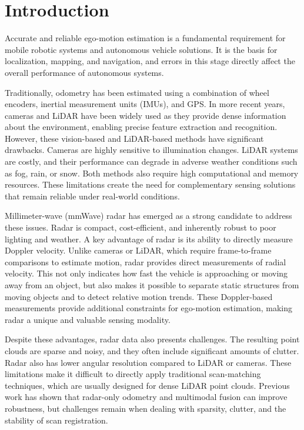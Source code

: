 \section{Introduction}
\label{sec:introduction}

Accurate and reliable ego-motion estimation is a fundamental requirement for mobile robotic systems and autonomous vehicle solutions.  
It is the basis for localization, mapping, and navigation, and errors in this stage directly affect the overall performance of autonomous systems.  

Traditionally, odometry has been estimated using a combination of wheel encoders, inertial measurement units (IMUs), and GPS.  
In more recent years, cameras and LiDAR have been widely used as they provide dense information about the environment, enabling precise feature extraction and recognition.  
However, these vision-based and LiDAR-based methods have significant drawbacks.  
Cameras are highly sensitive to illumination changes.  
LiDAR systems are costly, and their performance can degrade in adverse weather conditions such as fog, rain, or snow.  
Both methods also require high computational and memory resources.  
These limitations create the need for complementary sensing solutions that remain reliable under real-world conditions.  

Millimeter-wave (mmWave) radar has emerged as a strong candidate to address these issues.  
Radar is compact, cost-efficient, and inherently robust to poor lighting and weather.  
A key advantage of radar is its ability to directly measure Doppler velocity.  
Unlike cameras or LiDAR, which require frame-to-frame comparisons to estimate motion, radar provides direct measurements of radial velocity.  
This not only indicates how fast the vehicle is approaching or moving away from an object, but also makes it possible to separate static structures from moving objects and to detect relative motion trends.  
These Doppler-based measurements provide additional constraints for ego-motion estimation, making radar a unique and valuable sensing modality.  

Despite these advantages, radar data also presents challenges.  
The resulting point clouds are sparse and noisy, and they often include significant amounts of clutter.  
Radar also has lower angular resolution compared to LiDAR or cameras.  
These limitations make it difficult to directly apply traditional scan-matching techniques, which are usually designed for dense LiDAR point clouds.  
Previous work has shown that radar-only odometry and multimodal fusion can improve robustness, but challenges remain when dealing with sparsity, clutter, and the stability of scan registration.  


